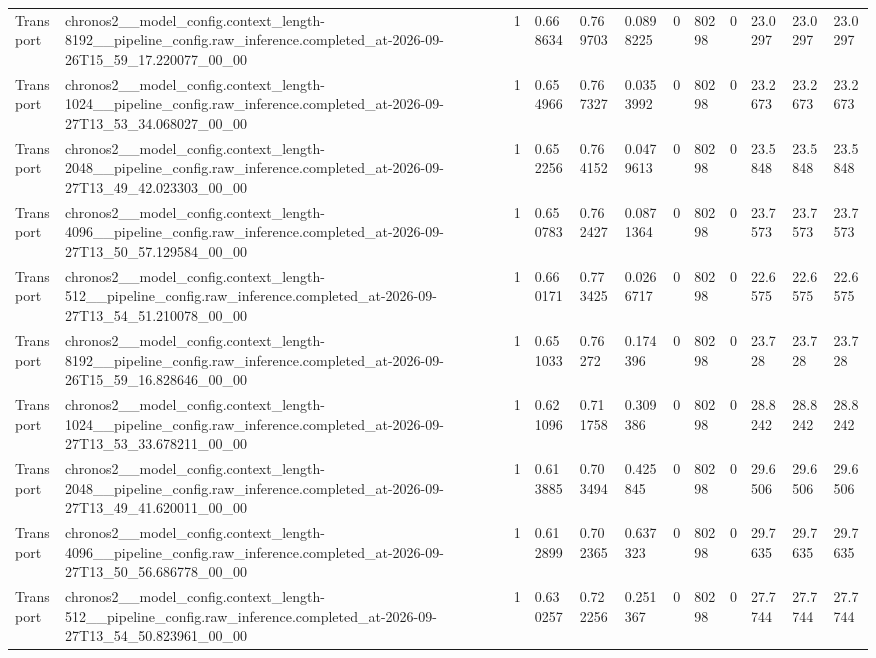 \begin{tabular}{llllllllllll}
Transport & chronos2\_\_model\_config.context\_length-8192\_\_pipeline\_config.raw\_inference.completed\_at-2026-09-26T15\_59\_17.220077\_00\_00 & 1 & 0.668634 & 0.769703 & 0.0898225 & 0 & 80298 & 0 & 23.0297 & 23.0297 & 23.0297 \\
Transport & chronos2\_\_model\_config.context\_length-1024\_\_pipeline\_config.raw\_inference.completed\_at-2026-09-27T13\_53\_34.068027\_00\_00 & 1 & 0.654966 & 0.767327 & 0.0353992 & 0 & 80298 & 0 & 23.2673 & 23.2673 & 23.2673 \\
Transport & chronos2\_\_model\_config.context\_length-2048\_\_pipeline\_config.raw\_inference.completed\_at-2026-09-27T13\_49\_42.023303\_00\_00 & 1 & 0.652256 & 0.764152 & 0.0479613 & 0 & 80298 & 0 & 23.5848 & 23.5848 & 23.5848 \\
Transport & chronos2\_\_model\_config.context\_length-4096\_\_pipeline\_config.raw\_inference.completed\_at-2026-09-27T13\_50\_57.129584\_00\_00 & 1 & 0.650783 & 0.762427 & 0.0871364 & 0 & 80298 & 0 & 23.7573 & 23.7573 & 23.7573 \\
Transport & chronos2\_\_model\_config.context\_length-512\_\_pipeline\_config.raw\_inference.completed\_at-2026-09-27T13\_54\_51.210078\_00\_00 & 1 & 0.660171 & 0.773425 & 0.0266717 & 0 & 80298 & 0 & 22.6575 & 22.6575 & 22.6575 \\
Transport & chronos2\_\_model\_config.context\_length-8192\_\_pipeline\_config.raw\_inference.completed\_at-2026-09-26T15\_59\_16.828646\_00\_00 & 1 & 0.651033 & 0.76272 & 0.174396 & 0 & 80298 & 0 & 23.728 & 23.728 & 23.728 \\
Transport & chronos2\_\_model\_config.context\_length-1024\_\_pipeline\_config.raw\_inference.completed\_at-2026-09-27T13\_53\_33.678211\_00\_00 & 1 & 0.621096 & 0.711758 & 0.309386 & 0 & 80298 & 0 & 28.8242 & 28.8242 & 28.8242 \\
Transport & chronos2\_\_model\_config.context\_length-2048\_\_pipeline\_config.raw\_inference.completed\_at-2026-09-27T13\_49\_41.620011\_00\_00 & 1 & 0.613885 & 0.703494 & 0.425845 & 0 & 80298 & 0 & 29.6506 & 29.6506 & 29.6506 \\
Transport & chronos2\_\_model\_config.context\_length-4096\_\_pipeline\_config.raw\_inference.completed\_at-2026-09-27T13\_50\_56.686778\_00\_00 & 1 & 0.612899 & 0.702365 & 0.637323 & 0 & 80298 & 0 & 29.7635 & 29.7635 & 29.7635 \\
Transport & chronos2\_\_model\_config.context\_length-512\_\_pipeline\_config.raw\_inference.completed\_at-2026-09-27T13\_54\_50.823961\_00\_00 & 1 & 0.630257 & 0.722256 & 0.251367 & 0 & 80298 & 0 & 27.7744 & 27.7744 & 27.7744 \\

\end{tabular}
